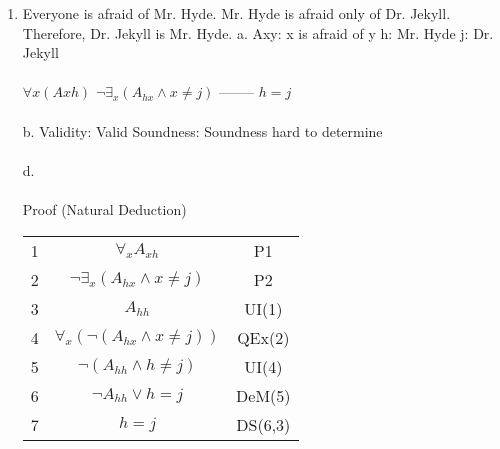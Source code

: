 \documentclass[]{article}
\begin{document}
\begin{enumerate}
    \item Everyone is afraid of Mr. Hyde. Mr. Hyde is afraid only of Dr. Jekyll. Therefore, Dr. Jekyll is Mr. Hyde.
    \newline a.
    \newline Axy: x is afraid of y
    \newline h: Mr. Hyde
    \newline j: Dr. Jekyll
    \\\\ $\forall x(Axh)$
    \newline $\neg \exists_x(A_{hx}\land x\neq j)$
    \newline --------
    \newline $h=j$
    \\\\b.
    \newline Validity: Valid
    \newline Soundness: Soundness hard to determine
    \\\\d.
    \\\\ Proof (Natural Deduction)
    \begin{tabular}{c| c | c}
        1 & $\forall_x A_{xh}$ & P1 \\
        2 & $\neg \exists_x (A_{hx} \land x \neq j)$ & P2 \\
        3 & $A_{hh}$ & UI(1) \\
        4 & $\forall_x(\neg(A_{hx} \land x \neq j))$ & QEx(2) \\
        5 & $\neg(A_{hh} \land h \neq j)$ & UI(4) \\
        6 & $\neg A_{hh} \lor h=j$ & DeM(5) \\
        7 & $h=j$ & DS(6,3) \\
    \end{tabular}
    

\end{enumerate}
\end{document}
